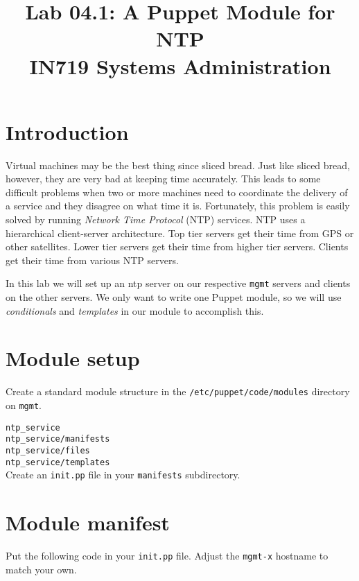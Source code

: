 \documentclass{article}   	%
\title{Lab 04.1: A Puppet Module for NTP \\ IN719 Systems Administration}
\date{}							%
\begin{document}
\maketitle

\section*{Introduction}
Virtual machines may be the best thing since sliced bread. Just like sliced bread, however, they are very bad at keeping time accurately. This leads to some difficult problems when two or more machines need to coordinate the delivery of a service and they disagree on what time it is. Fortunately, this problem is easily solved by running \emph{Network Time Protocol} (NTP) services. NTP uses a hierarchical client-server architecture. Top tier servers get their time from GPS or other satellites. Lower tier servers get their time from higher tier servers. Clients get their time from various NTP servers.

In this lab we will set up an ntp server on our respective \texttt{mgmt} servers and clients on the other servers. We only want to write one Puppet module, so we will use \emph{conditionals} and \emph{templates} in our module to accomplish this.

\section{Module setup}
Create a standard module structure in the \texttt{/etc/puppet/code/modules} directory on \texttt{mgmt}.

\texttt{ntp\_service} \\
\texttt{ntp\_service/manifests} \\
\texttt{ntp\_service/files} \\
\texttt{ntp\_service/templates} \\

Create an \texttt{init.pp} file in your \texttt{manifests} subdirectory.

\section{Module manifest}
Put the following code in your \texttt{init.pp} file.  Adjust the \texttt{mgmt-x} hostname to match your own.
\end{document}
